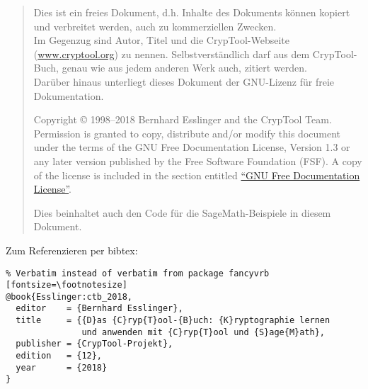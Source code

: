 \VerbatimFootnotes
\renewcommand\footnoterule{
\vspace{2em}%
\hrule width .4\columnwidth
\vspace{4pt}
}%
\frontmatter %
\maketitle

\begin{quote}
Dies ist ein freies Dokument, d.h. Inhalte des Dokuments können kopiert und
verbreitet werden, auch zu kommerziellen Zwecken.\\
Im Gegenzug sind Autor, Titel und die CrypTool-Webseite (\url{www.cryptool.org}) zu
nennen. Selbstverständlich darf aus dem CrypTool-Buch, genau wie aus jedem
anderen Werk auch, zitiert werden. \\
Darüber hinaus unterliegt dieses Dokument der GNU-Lizenz für freie
Dokumentation.

    Copyright \copyright{} 1998--2018 Bernhard Esslinger and the
    CrypTool Team. Permission is granted to copy,
    distribute and/or modify this document under the terms of the GNU
    Free Documentation License, Version 1.3 or any later version
    published by the Free Software Foundation (FSF). A copy of
    the license is included in the section entitled
    \hyperlink{appendix-GNU-fdl}{``GNU Free Documentation License''}.

    Dies beinhaltet auch den Code für die SageMath-Beispiele in diesem Dokument.
\end{quote}



\vspace{70pt}\noindent Zum Referenzieren per bibtex:
\begin{Verbatim}% Verbatim instead of verbatim from package fancyvrb
[fontsize=\footnotesize]
@book{Esslinger:ctb_2018,
  editor    = {Bernhard Esslinger},
  title     = {{D}as {C}ryp{T}ool-{B}uch: {K}ryptographie lernen
               und anwenden mit {C}ryp{T}ool und {S}age{M}ath},
  publisher = {CrypTool-Projekt},
  edition   = {12},
  year      = {2018}
}
\end{Verbatim}



